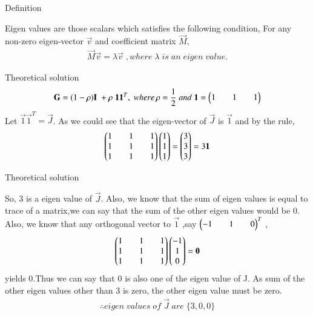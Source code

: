 \documentclass{beamer}
\begin{document}
\begin{frame}{Definition}

Eigen values are those scalars which satisfies the following condition,
For any non-zero eigen-vector $\vec{v}$ and coefficient matrix $\vec{M}$,
\begin{align*}
    \vec{M}\vec{v}=\lambda \vec{v} \; , where \; \lambda \;is\; an \;eigen\; value.
\end{align*}
\end{frame}

\begin{frame}{Theoretical solution}
\begin{align*}
     \mathbf{G}=(1-\rho)\mathbf{I}\;+\rho\;\mathbf{1}\mathbf{1}^T, \; where\, \rho=\frac{1}{2}\;and\;\mathbf{1}=\begin{pmatrix}1&&1&&1\end{pmatrix}
\end{align*}
Let $\vec{1}\vec{1}^T=\vec{J}$. As we could see that the eigen-vector of $\vec{J}$ is $\vec{1}$ and by the rule,
\begin{align*}
    \begin{pmatrix}1&&1&&1\\1&&1&&1\\1&&1&&1\end{pmatrix}\begin{pmatrix}1\\1\\1\end{pmatrix}=\begin{pmatrix}3\\3\\3\end{pmatrix}=3\mathbf{1}
\end{align*}


\end{frame}


\begin{frame}{Theoretical solution}

So, 3 is a eigen value of $\vec{J}$. Also, we know that the sum of eigen values is equal to trace of a matrix,we can say that the sum of the other eigen values would be 0. Also, we know that any orthogonal vector to $\vec{1}$ ,say $\begin{pmatrix}-1&&1&&0\end{pmatrix}^T$ ,
\begin{align*}
    \begin{pmatrix}1&&1&&1\\1&&1&&1\\1&&1&&1\end{pmatrix}\begin{pmatrix}-1\\1\\0\end{pmatrix}=\mathbf{0}
\end{align*}
yields 0.Thus we can say that 0 is also one of the eigen value of J. As sum of the other eigen values other than 3 is zero, the other eigen value must be zero.
\begin{align*}
    \therefore eigen\;values\;of\;\vec{J}\;are\;\{3,0,0\}
\end{align*}
\end{frame}
\end{document}

